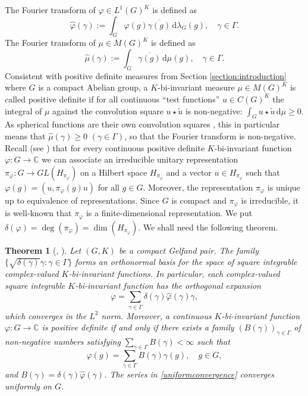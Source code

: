 \documentclass[[a4paper,english,12pt]{amsart}
\theoremstyle{plain}
\newtheorem{theorem}{Theorem}
\theoremstyle{remark}
\newcommand{\ff}{\varphi}
\newcommand{\CC}{\mathbb C}
\begin{document}
The Fourier transform of \(\ff \in L^1(G)^K\) is defined as
\begin{equation*}
    \widehat{\ff}(\gamma):=\int_{G} \ff(g) \overline{\gamma(g)} \,\mbox{d}\lambda_{G}(g), \quad \gamma \in \Gamma.
\end{equation*}
The Fourier transform of \(\mu \in M(G)^K\) is defined as
\begin{equation*}
    \widehat{\mu}(\gamma):=\int_{G} \overline{\gamma(g)} \,\mbox{d}\mu(g), \quad \gamma \in \Gamma.
\end{equation*}
Consistent with positive definite measures from Section \ref{section:introduction} where $G$ is a compact Abelian group, a $K$-bi-invariant measure $\mu \in M(G)^{K}$ is called positive definite if for all continuous ``test functions'' $u\in C(G)^{K}$ the integral of $\mu$ against the convolution square $u \star \widetilde{u}$ is non-negative: $\int_G u \star \widetilde{u} \,\mbox{d} \mu \ge 0.$ As spherical functions are their own convolution squares \cite[Theorem 8.2.6]{wolf}, this in particular means that $\widehat{\mu}(\gamma) \ge 0$ $(\gamma \in \Gamma)$, so that the Fourier transform is non-negative. 
Recall (see \cite[Proposition 8.4.6, Theorem 8.4.8]{wolf}) that for every continuous positive definite \(K\)-bi-invariant function \(\ff: G \to \mathbb{C}\) we can associate an irreducible unitary representation \(\pi_\ff: G \to GL(H_{\pi_\ff})\) on a Hilbert space \(H_{\pi_\ff}\) and a vector \(u \in H_{\pi_\ff}\) such that \(\ff(g)=(u, \pi_\ff(g)u)\) for all \(g \in G\). Moreover, the representation \(\pi_\ff\) is unique up to equivalence of representations. Since \(G\) is compact and \(\pi_\ff\) is irreducible, it is well-known that \(\pi_\ff\) is a finite-dimensional representation. We put \(\delta(\ff)= \deg(\pi_\ff) = \dim(H_{\pi_\ff})\).
We shall need the following theorem.

\begin{theorem}[{\cite[Proposition 9.10.4]{wolf}, \cite[Theorem 2.6]{bergetal}}]\label{expansion}
Let \((G,K)\) be a compact Gelfand pair. The family \(\{\sqrt{\delta(\gamma)}\gamma: \gamma \in \Gamma\}\) forms an orthonormal basis for the space of square integrable complex-valued $K$-bi-invariant functions. In particular, each complex-valued square integrable $K$-bi-invariant function has the orthogonal expansion
\[
\ff  = \sum_{\gamma \in \Gamma}\delta(\gamma)\widehat{\ff}(\gamma)\gamma,
\]
which converges in the $L^2$ norm. Moreover, a continuous $K$-bi-invariant function \(\ff: G \to  \CC\) is positive definite if and only if there exists a family \((B(\gamma))_{\gamma \in \Gamma}\) of non-negative numbers satisfying \(\sum_{\gamma \in \Gamma}B(\gamma) < \infty\) such that 
\begin{equation}\label{uniformconvergence}
\ff(g) = \sum_{\gamma \in \Gamma}B(\gamma)\gamma(g), \quad g\in G,
\end{equation}
and \(B(\gamma) = \delta(\gamma)\widehat{\ff}(\gamma)\). The series in \eqref{uniformconvergence} converges uniformly on \(G\).
\end{theorem}
\end{document}
